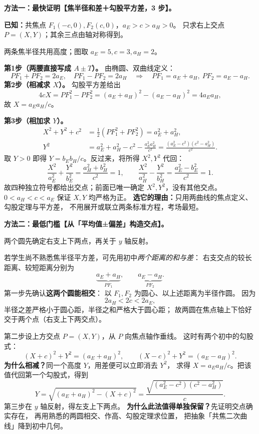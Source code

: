 \clearpage
\begin{proofbox}
\textbf{方法一：最快证明【焦半径和差＋勾股平方差，3 步】。}

\textbf{已知：}共焦点 $F_1(-c,0),F_2(c,0)$，$a_E>c>a_H>0$。
只求右上交点 $P=(X,Y)$；其余三点由轴对称得到。

\begin{center}


{\small 两条焦半径共用高度；图取 $a_E=5,c=3,a_H=2$。}
\end{center}


\textbf{第1步（两腰直接写成 $A\pm T$）。}
由椭圆、双曲线定义：
\[
PF_1+PF_2=2a_E,\quad PF_1-PF_2=2a_H
\quad\Longrightarrow\quad
PF_1=a_E+a_H,\ PF_2=a_E-a_H.
\]
\textbf{第2步（相减求 $X$）。}
勾股平方差给出
\[
4cX=PF_1^2-PF_2^2
=(a_E+a_H)^2-(a_E-a_H)^2=4a_Ea_H,
\]
故 $\displaystyle\boxed{X=a_Ea_H/c}$。

\textbf{第3步（相加求 $Y$）。}
\[
\begin{aligned}
X^2+Y^2+c^2&=\tfrac12(PF_1^2+PF_2^2)=a_E^2+a_H^2,\\
Y^2&=a_E^2+a_H^2-c^2-\frac{a_E^2a_H^2}{c^2}
=\frac{(a_E^2-c^2)(c^2-a_H^2)}{c^2}.
\end{aligned}
\]
取 $Y>0$ 即得 $Y=b_Eb_H/c$。反过来，将所得 $X^2,Y^2$ 代回：
\[
\frac{X^2}{a_E^2}+\frac{Y^2}{b_E^2}
=\frac{a_H^2+b_H^2}{c^2}=1,\qquad
\frac{X^2}{a_H^2}-\frac{Y^2}{b_H^2}
=\frac{a_E^2-b_E^2}{c^2}=1.
\]
故四种独立符号都给出交点；前面已唯一确定 $X^2,Y^2$，没有其他交点。
$0<a_H<c<a_E$ 保证 $X,Y$ 均严格为正。
\textbf{选它的理由：}只用两曲线的焦点定义、勾股定理与平方差，
不用展开或联立两条标准方程，考场最短。
\end{proofbox}

\clearpage
\begin{proofbox}
\textbf{方法二：最低门槛【从「平均值±偏差」构造交点】。}

\begin{center}


{\small 两个圆先确定右支上下两点，再关于 $y$ 轴反射。}
\end{center}


若学生尚不熟悉焦半径平方差，可先用初中\emph{两个距离的和与差}：
右支交点的较长距离、较短距离分别为
\[
\underbrace{a_E+a_H}_{PF_1},\qquad
\underbrace{a_E-a_H}_{PF_2}.
\]
第一步先确认\textbf{这两个圆能相交}：
以 $F_1,F_2$ 为圆心、以上述距离为半径作圆。
因为
\[
2a_H<2c<2a_E,
\]
半径之差严格小于圆心距，半径之和严格大于圆心距；
故两圆在焦点轴上下恰好交于两个点（右支上下两交点）。

第二步设上方交点 $P=(X,Y)$，从 $P$ 向焦点轴作垂线。
这时有两个初中的勾股式：
\[
(X+c)^2+Y^2=(a_E+a_H)^2,\qquad
(X-c)^2+Y^2=(a_E-a_H)^2.
\]
\textbf{为什么相减？}同一个高度 $Y$，用差便可以立即消去 $Y^2$，
求得 $X=a_Ea_H/c$。把该值代回第一个勾股式，得到
\[
Y=\sqrt{(a_E+a_H)^2-(X+c)^2}
=\frac{\sqrt{(a_E^2-c^2)(c^2-a_H^2)}}{c}.
\]
第三步在 $y$ 轴反射，得左支上下两点。
\textbf{为什么此法值得单独保留？}先证明交点确实存在，
再用熟悉的两圆相交、作高、勾股定理求位置，
把抽象「共焦二次曲线」降到初中几何。
\end{proofbox}

